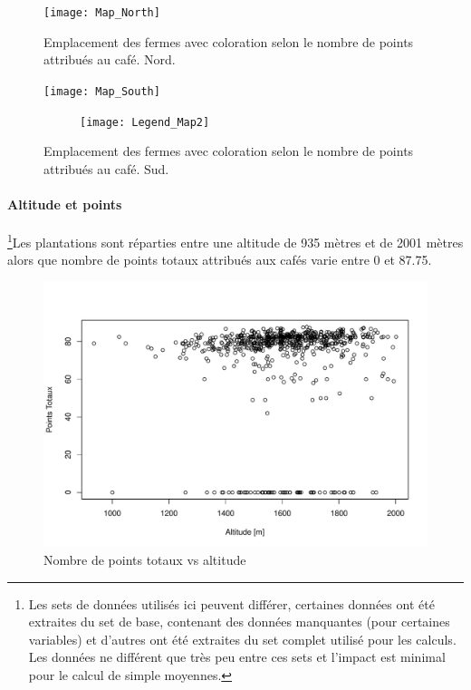 \begin{figure}[H]
	\texttt{[image: Map\_North]}
	\caption{Emplacement des fermes avec coloration selon le nombre de points attribués au café. Nord.}
\end{figure}

\begin{figure}[H]
	\texttt{[image: Map\_South]}
	
	\begin{figure}[H]
		\texttt{[image: Legend\_Map2]}
	\end{figure}
	\caption{\label{FincaVSPoints} Emplacement des fermes avec coloration selon le nombre de points attribués au café. Sud.}
\end{figure}


\newpage
\paragraph{Altitude et points} \footnote{Les sets de données utilisés ici peuvent différer, certaines données ont été extraites du set de base, contenant des données manquantes (pour certaines variables) et d'autres ont été extraites du set complet utilisé pour les calculs. Les données ne différent que très peu entre ces sets et l'impact est minimal pour le calcul de simple moyennes.}Les plantations sont réparties entre une altitude de 935 mètres et de 2001 mètres alors que nombre de points totaux attribués aux cafés varie entre 0 et 87.75. 

\begin{figure}[H]
	\centering
	\includegraphics[width=0.7\linewidth]{img/Exploration/plotAltitudeVsPuntajeTotal}
	\caption{Nombre de points totaux vs altitude}
	\label{fig:plotaltitudevspuntajetotal}
\end{figure}


